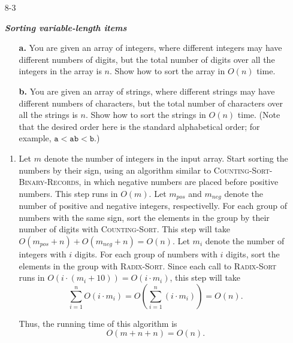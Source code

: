 \documentclass{report}
\makeatletter
\renewenvironment{framed}{%
 \def\FrameCommand##1{\hskip\@totalleftmargin
 \fboxsep=\FrameSep\fbox{##1}}%
 \MakeFramed {\advance\hsize-\width
   \@totalleftmargin\z@ \linewidth\hsize
   \@setminipage}}%
 {\par\unskip\endMakeFramed}
\makeatother
\begin{document}
\begin{enumerate}
\begin{framed}
\begin{enumerate}
\end{enumerate}
\end{framed}

\newpage

\item[8-3]{\textbf{\emph{Sorting variable-length items}}
\begin{enumerate}
\item[\textbf{a.}]{You are given an array of integers, where different integers
may have different numbers of digits, but the total number of digits over all
the integers in the array is $n$. Show how to sort the array in $O(n)$ time.}
\item[\textbf{b.}]{You are given an array of strings, where different strings
may have different numbers of characters, but the total number of characters
over all the strings is $n$. Show how to sort the strings in $O(n)$ time.
(Note that the desired order here is the standard alphabetical order; for
example, $\texttt{a} < \texttt{ab} < \texttt{b}$.)}
\end{enumerate}
}

\begin{framed}
\begin{enumerate}
\item Let $m$ denote the number of integers in the input array. Start sorting
the numbers by their sign, using an algorithm similar to
\textsc{Counting-Sort-Binary-Records}, in which negative numbers are placed
before positive numbers. This step runs in $O(m)$. Let $m_{pos}$ and $m_{neg}$
denote the number of positive and negative integers, respectivelly. For each
group of numbers with the same sign, sort the elements in the group by their
number of digits with \textsc{Counting-Sort}. This step will take $O(m_{pos}
+ n) + O(m_{neg} + n) = O(n)$. Let $m_i$ denote the number of integers with $i$
digits. For each group of numbers with $i$ digits, sort the elements in the
group with \textsc{Radix-Sort}. Since each call to \textsc{Radix-Sort} runs in
$O(i \cdot (m_i + 10)) = O(i \cdot m_i)$, this step will take
\[
  \sum_{i = 1}^{n} O(i \cdot m_i)
  = O\left( \sum_{i = 1}^{n} (i \cdot m_i) \right)
  = O(n).
\]

Thus, the running time of this algorithm is
\[
  O(m + n + n) = O(n).
\]


\end{enumerate}
\end{framed}
\end{enumerate}
\end{document}
